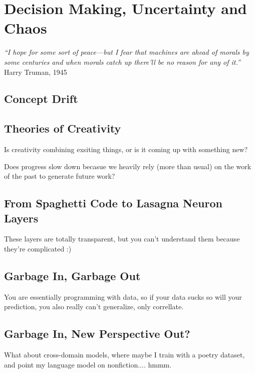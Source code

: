 \setchapterpreamble[u]{\margintoc}
\chapter{Decision Making, Uncertainty and Chaos}

\textit{“I hope for some sort of peace—but I fear that machines are ahead of morals by some centuries and when morals catch up there'll be no reason for any of it.”} Harry Truman, 1945 \cite{McCullough1992}



\section{Concept Drift}

\section{Theories of Creativity}

Is creativity combining exsiting things, or is it coming up with something new?

Does progress slow down becasue we heavily rely (more than usual) on the work of the past to generate future work?

\section{From Spaghetti Code to Lasagna Neuron Layers}

These layers are totally transparent, but you can't understand them because they're complicated :)

\section{Garbage In, Garbage Out}

You are essentially programming with data, so if your data sucks so will your prediction, you also really can't generalize, only correllate.

\section{Garbage In, New Perspective Out?}

What about cross-domain models, where maybe I train with a poetry dataset, and point my language model on nonfiction.... hmmm.

